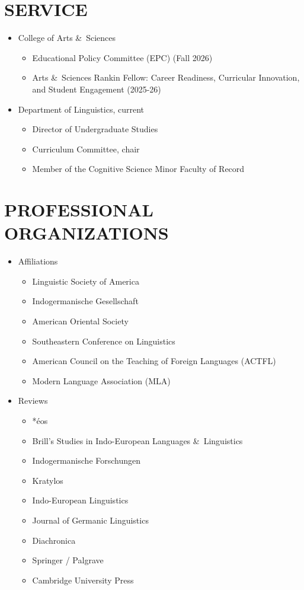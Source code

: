 \documentclass[paper=letter,fontsize=11pt,enabledeprecatedfontcommands]{scrartcl} %
\newcommand{\NewPart}[2]{\section*{\uppercase{#1} #2}}
\begin{document}
\NewPart{Service}{}
\begin{itemize}
\item College of Arts \&~Sciences
\begin{itemize}
    \item Educational Policy Committee (EPC) (Fall 2026)
    \item Arts \&~Sciences Rankin Fellow: Career Readiness, Curricular Innovation, and Student Engagement (2025-26)
\end{itemize}
\item Department of Linguistics, current
\begin{itemize}
    \item Director of Undergraduate Studies
    \item Curriculum Committee, chair
    \item Member of the Cognitive Science Minor Faculty of Record
\end{itemize}
\end{itemize}

\NewPart{Professional organizations}{}
\begin{itemize}
\item Affiliations
\begin{itemize}
    \item Linguistic Society of America
    \item Indogermanische Gesellschaft
    \item American Oriental Society
    \item Southeastern Conference on Linguistics
    \item American Council on the Teaching of Foreign Languages (ACTFL)
    \item Modern Language Association (MLA)
\end{itemize}
\item Reviews
\begin{itemize}
    \item *\'{e}os
    \item Brill’s Studies in Indo-European Languages \&~Linguistics 
    \item Indogermanische Forschungen
    \item Kratylos
    \item Indo-European Linguistics
    \item Journal of Germanic Linguistics
    \item Diachronica
    \item Springer / Palgrave
    \item Cambridge University Press
\end{itemize}
\end{itemize}
\end{document}

